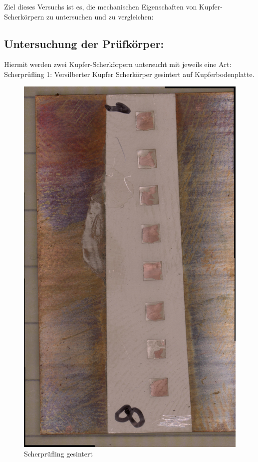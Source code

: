 Ziel dieses Versuchs ist es, die mechanischen Eigenschaften von Kupfer-Scherkörpern zu
untersuchen und zu vergleichen:\\
\subsection{Untersuchung der Prüfkörper:}
Hiermit werden zwei Kupfer-Scherkörpern untersucht mit jeweils eine Art:\\
Scherprüfling 1: Versilberter Kupfer Scherkörper gesintert auf Kupferbodenplatte.\\
\vspace{0.05cm}
\begin{figure}[h]
    \centering
    \includegraphics[scale=0.1, angle=90]{Bilder/Bodenplatte_Sintern_Gesamt.jpg}
    \caption{Scherprüfling gesintert}
    \vspace{0.2cm}
    \label{Abb.2: Scherprüfling gesintert}
\end{figure}\\
